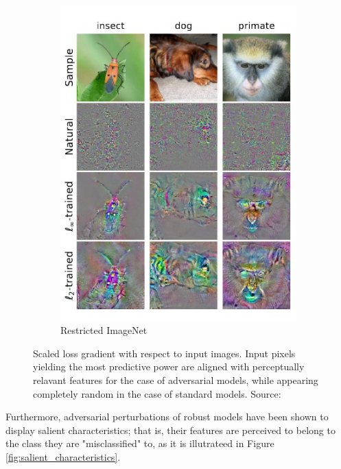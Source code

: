\begin{figure}[H]
\begin{subfigure}[b]{0.35\textwidth}
        \centering
        \includegraphics[width=\textwidth]{img/introduction/adversarial_loss_2.jpg}
        \caption{Restricted ImageNet}
    \end{subfigure}
       \caption{Scaled loss gradient with respect to input images.
       Input pixels yielding the most predictive power are aligned 
       with perceptually relavant features for the case of adversarial
       models, while appearing completely random in the case of 
       standard models.
       Source: \cite{tsiprasRobustnessMayBe2019}}
       \label{fig:adversarial_loss}
\end{figure}

Furthermore, adversarial perturbations of robust models have 
been shown to display salient characteristics;
that is, their features are perceived to belong to the
class they are "misclassified" to, as it is illutrateed in 
Figure \ref{fig:salient_characteristics}. 

